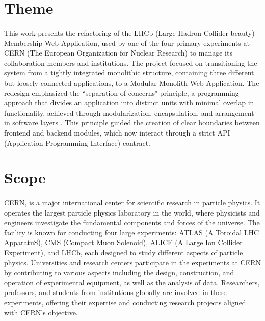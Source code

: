 \section{Theme} \paragraph{} This work presents the refactoring of the LHCb (Large Hadron Collider beauty) Membership Web Application, used by one of the four primary experiments at CERN (The European Organization for Nuclear Research) to manage its collaboration members and institutions. The project focused on transitioning the system from a tightly integrated monolithic structure, containing three different but loosely connected applications, to a Modular Monolith Web Application. The redesign emphasized the ``separation of concerns" principle, a programming approach that divides an application into distinct units with minimal overlap in functionality, achieved through modularization, encapsulation, and arrangement in software layers \cite{SAP_ABAP_Doc}. This principle guided the creation of clear boundaries between frontend and backend modules, which now interact through a strict API (Application Programming Interface) contract.


\section{Scope}

\paragraph{}  CERN, is a major international center for scientific research in particle physics. It operates the largest particle physics laboratory in the world, where physicists and engineers investigate the fundamental components and forces of the universe. The facility is known for conducting four large experiments: ATLAS (A Toroidal LHC ApparatuS), CMS (Compact Muon Solenoid), ALICE (A Large Ion Collider Experiment), and LHCb, each designed to study different aspects of particle physics. Universities and research centers participate in the experiments at CERN by contributing to various aspects including the design, construction, and operation of experimental equipment, as well as the analysis of data. Researchers, professors, and students from institutions globally are involved in these experiments, offering their expertise and conducting research projects aligned with CERN's objective. 

